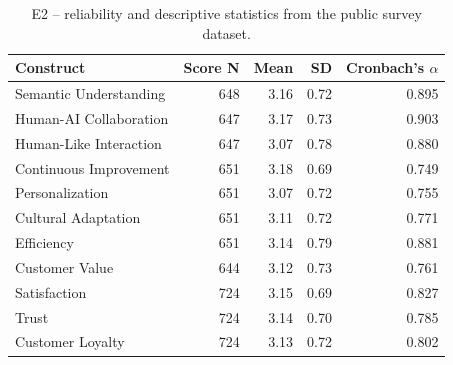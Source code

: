 \documentclass[runningheads]{llncs}
\begin{document}
\begin{table}[t]
\caption{E2 -- reliability and descriptive statistics from the public survey dataset.}\label{tab:e2rel}
\centering
\small
\begin{tabular}{@{}lrrrr@{}}
\toprule
Construct & Score N & Mean & SD & Cronbach's $\alpha$ \\
\midrule
Semantic Understanding & 648 & 3.16 & 0.72 & 0.895 \\
Human-AI Collaboration & 647 & 3.17 & 0.73 & 0.903 \\
Human-Like Interaction & 647 & 3.07 & 0.78 & 0.880 \\
Continuous Improvement & 651 & 3.18 & 0.69 & 0.749 \\
Personalization & 651 & 3.07 & 0.72 & 0.755 \\
Cultural Adaptation & 651 & 3.11 & 0.72 & 0.771 \\
Efficiency & 651 & 3.14 & 0.79 & 0.881 \\
Customer Value & 644 & 3.12 & 0.73 & 0.761 \\
Satisfaction & 724 & 3.15 & 0.69 & 0.827 \\
Trust & 724 & 3.14 & 0.70 & 0.785 \\
Customer Loyalty & 724 & 3.13 & 0.72 & 0.802 \\
\bottomrule
\end{tabular}
\end{table}
\end{document}
